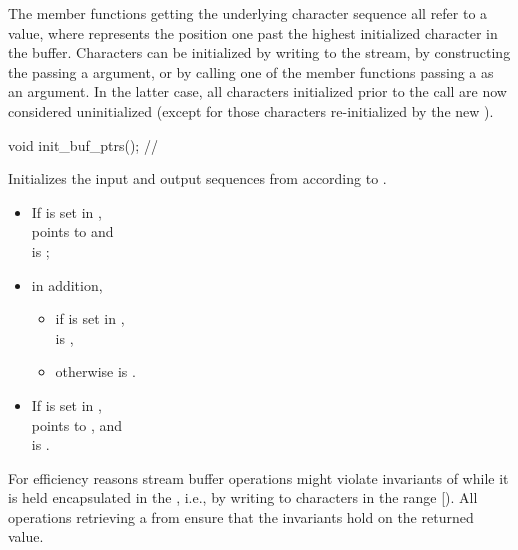 \documentclass[ebook,11pt,article]{memoir}
\begin{document}
\begin{addedblock}
\pnum
The member functions getting the underlying character sequence all refer to a  value, 
 where
 represents the position one past the highest initialized character
in the buffer. Characters can be initialized by writing to the stream, by constructing
the  passing a  argument, or by calling one of 
the
 member functions passing a  as an argument. 
In the latter case, all characters initialized prior to
the call are now considered uninitialized (except for those characters re-initialized
by the new ).  

\begin{itemdecl}
void init_buf_ptrs(); // \expos
\end{itemdecl}
\begin{itemdescr}
\pnum
\effects 
Initializes the input and output sequences from  according to .

\pnum
\ensures
\begin{itemize}
\item If  is set in ,\\ 
 points to  and \\ is ; 
\item in addition, 
\begin{itemize}
\item if  is set in , \\
 is , 
\item otherwise  is . 
\end{itemize}
\item If  is set in , \\
 points to , 
and \\ \tcode{\&\&}  is .
\end{itemize}

\pnum
\begin{note}
For efficiency reasons stream buffer operations might violate invariants of  while it is held encapsulated in the , i.e., by writing to characters in the range [). All operations retrieving a  from  ensure that the  invariants hold on the returned value.
\end{note}
\end{itemdescr}
\end{addedblock}
\end{document}

